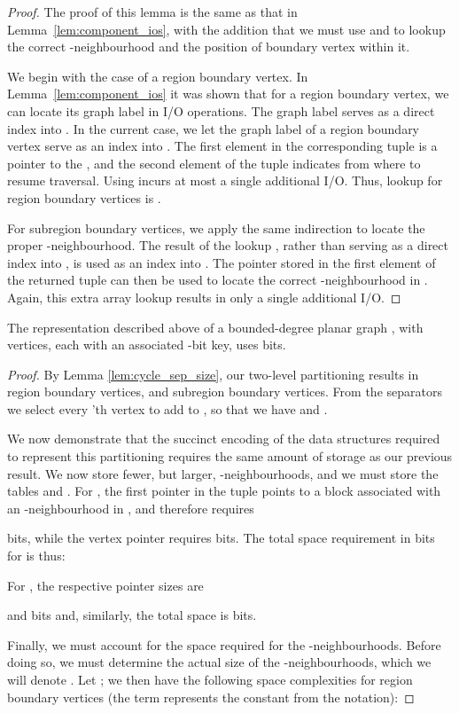 \begin{proof}
The proof of this lemma is the same as that in 
Lemma~\ref{lem:component_ios}, with the addition that we must
use  and  to lookup the correct 
-neighbourhood and the position of boundary vertex 
within it.

We begin with the case of a region boundary vertex.
In Lemma~\ref{lem:component_ios} it was shown that for a region
boundary vertex, we can locate its graph label in  I/O
operations.
The graph label serves as a direct index into .
In the current case, we let the graph label of a region boundary
vertex serve as an index into .
The first element in the corresponding tuple is a pointer to the
, and the second element of the tuple indicates from where
to resume traversal.
Using  incurs at most a single additional I/O.
Thus, lookup for region boundary vertices is .

For subregion boundary vertices, we apply the same indirection
to locate the proper -neighbourhood.
The result of the lookup , rather
than serving as a direct index into , is used 
as an index into .
The pointer stored in the first element of the returned
tuple can then be used to locate the correct -neighbourhood
in . 
Again, this extra array lookup results in only a single 
additional I/O.
\end{proof}

\begin{lemma}\label{lem:cycle_sep_space}
  The representation described above of a bounded-degree planar graph , 
  with  vertices, each with an associated -bit key, uses 
   bits.
\end{lemma}

\begin{proof}
By Lemma \ref{lem:cycle_sep_size}, our two-level partitioning results
in  region boundary vertices, and
 subregion boundary vertices. From the separators
we select every 'th vertex to add to ,
so that we have  and .

We now demonstrate that the succinct encoding of the data structures
required to represent this partitioning requires the same amount of
storage as our previous result. 
We now store fewer, but larger,
-neighbourhoods, and we must store the tables  and
.
For , the first pointer in the tuple points to a block 
associated with an -neighbourhood in
, and therefore requires 
 
bits, while the
vertex pointer requires  bits. The total space requirement in
bits for  is thus:



For , the respective pointer sizes are

and  bits and, similarly, the total space is 
bits.

Finally, we must account for the space required for the
-neighbourhoods. Before doing so, we must determine the actual
size of the -neighbourhoods, which we will denote . Let ; we
then have the following space complexities for region boundary
vertices (the term  represents the constant from the 
notation):







\end{proof}


